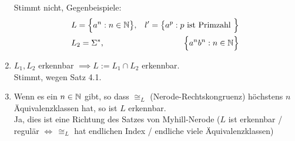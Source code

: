 \documentclass[12pt,a4paper]{article}
\begin{document}
\begin{enumerate}[label=\alph*)]
	Stimmt nicht, Gegenbeispiele:
	\begin{align*}
		&L=\Big\lbrace a^n:n\in\mathbb{N}\big\rbrace,& l'=\big\lbrace a^p:p\text{ ist Primzahl }\Big\rbrace\\
		&L_2=\Sigma^\ast, &\Big\lbrace a^n b^n:n\in\mathbb{N}\Big\rbrace
	\end{align*}
	\item $L_1,L_2$ erkennbar $\implies L:=L_1\cap L_2$ erkennbar.\\
	Stimmt, wegen Satz 4.1.
	\item Wenn es ein $n\in\mathbb{N}$ gibt, so dass $\cong_L$ (Nerode-Rechtskongruenz) höchstens $n$ Äquivalenzklassen hat, so ist $L$ erkennbar.\\
	Ja, dies ist eine Richtung des Satzes von Myhill-Nerode
	($L$ ist erkennbar / regulär $\Longleftrightarrow \, \cong_L$ hat endlichen Index / endliche viele Äquivalenzklassen)
\end{enumerate}
\end{document}
